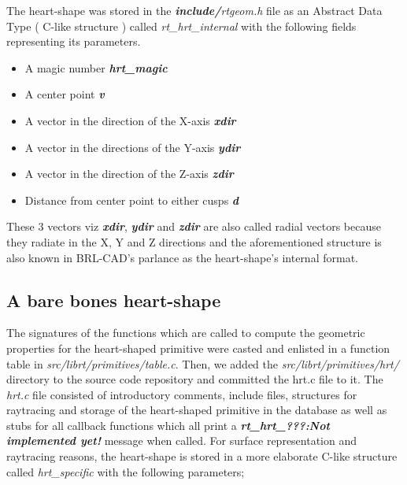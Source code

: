 The   heart-­shape   was   stored   in   the   \textit{\textbf{include/}rtgeom.h}   file   as   an   Abstract   Data  
Type   ( C-­like   structure )   called   \textit{rt\_hrt\_internal}   with   the   following   fields  
representing its parameters.
\begin{itemize}  
\item A magic number \textit{\textbf{hrt\_magic }} 
\item A center point \textit{\textbf{v }} 
\item A vector in the direction of the X-­axis \textit{\textbf{xdir}}  
\item A vector in the directions of the Y­-axis \textit{\textbf{ydir}}  
\item A vector in the direction of the Z­-axis \textit{\textbf{zdir}}  
\item Distance from center point to either cusps \textit{\textbf{d}} 
\end{itemize} 
These   3    vectors viz \textit{\textbf{xdir}}, \textit{\textbf{ydir}} and \textit{\textbf{zdir}}   are   also   called   radial   vectors   because   they   radiate   in   the  X,   Y   and   Z   directions   and   the   aforementioned   structure   is   also   known   in  BRL-­CAD's parlance as the heart-­shape's internal format.

\subsection{A bare bones heart­-shape}

The   signatures   of   the   functions   which   are   called   to   compute   the  
geometric   properties   for   the   heart-­shaped   primitive   were   casted   and   enlisted   in  
a   function   table   in   \textit{src/librt/primitives/table.c}.   Then,   we   added   the  
\textit{src/librt/primitives/hrt/}   directory   to   the   source   code   repository   and   committed  
the   hrt.c   file   to   it.   The   \textit{hrt.c}   file   consisted   of   introductory   comments,   include  
files,   structures   for   raytracing   and   storage   of   the   heart­-shaped   primitive   in   the  
database   as   well   as   stubs   for   all   callback   functions   which   all   print   a  
\textit{\textbf{\“rt\_hrt\_???:Not   implemented   yet!\”}}   message   when   called.   For   surface  
representation   and   raytracing   reasons,   the   heart-­shape   is   stored   in   a   more  
elaborate C-­like structure called \textit{hrt\_specific} with the following parameters;  

